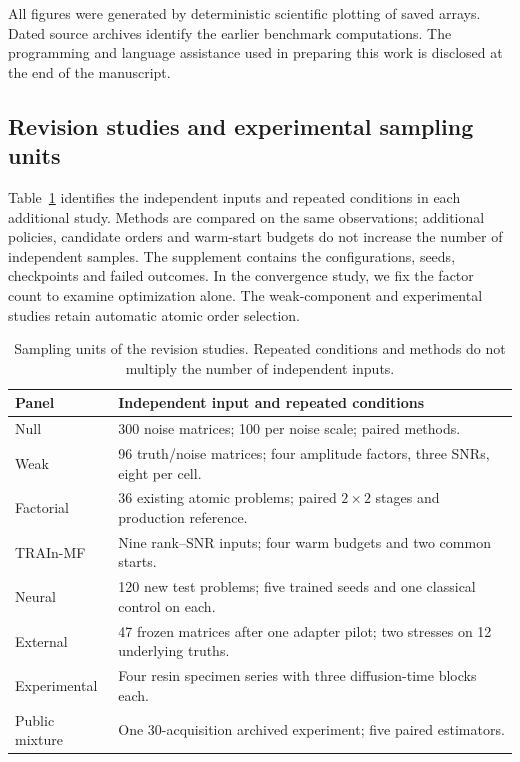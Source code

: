 All figures were generated by deterministic scientific plotting of saved arrays.
Dated source archives identify the earlier benchmark computations. The programming
and language assistance used in preparing this work is disclosed at the end of
the manuscript.

\subsection{Revision studies and experimental sampling units}\label{sec:extendeddesign}
Table~\ref{tab:revisionunits} identifies the independent inputs and repeated
conditions in each additional study. Methods are compared on the same observations;
additional policies, candidate orders and warm-start budgets do not increase the
number of independent samples. The supplement contains the configurations, seeds,
checkpoints and failed outcomes. In the convergence study, we fix the factor count
to examine optimization alone. The weak-component and experimental studies retain
automatic atomic order selection.

\begin{table}[htbp]\centering\small
\caption{Sampling units of the revision studies. Repeated conditions and
methods do not multiply the number of independent inputs.}\label{tab:revisionunits}
\begin{tabularx}{\linewidth}{@{}lX@{}}\toprule
Panel & Independent input and repeated conditions\\\midrule
Null & 300 noise matrices; 100 per noise scale; paired methods.\\
Weak & 96 truth/noise matrices; four amplitude factors, three SNRs, eight per cell.\\
Factorial & 36 existing atomic problems; paired $2\times2$ stages and production reference.\\
TRAIn-MF & Nine rank--SNR inputs; four warm budgets and two common starts.\\
Neural & 120 new test problems; five trained seeds and one classical control on each.\\
External & 47 frozen matrices after one adapter pilot; two stresses on 12 underlying truths.\\
Experimental & Four resin specimen series with three diffusion-time blocks each.\\
Public mixture & One 30-acquisition archived experiment; five paired estimators.\\\bottomrule
\end{tabularx}\end{table}

